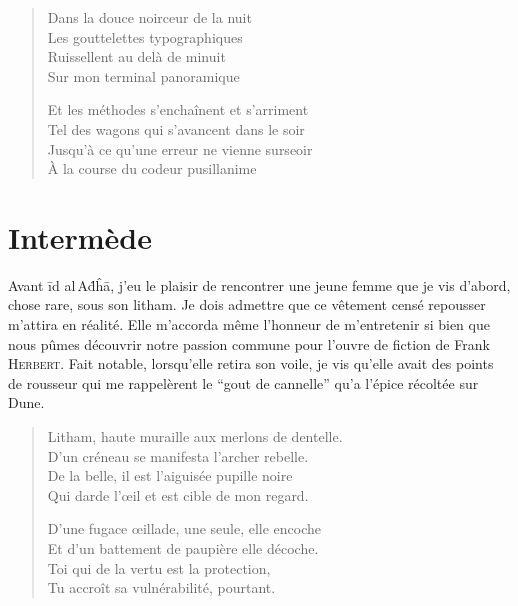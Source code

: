 \begin{verse}
Dans la douce noirceur de la nuit\\
Les gouttelettes typographiques\\
Ruissellent au delà de minuit\\
Sur mon terminal panoramique

Et les méthodes s’enchaînent et s’arriment\\
Tel des wagons qui s’avancent dans le soir\\
Jusqu’à ce qu’une erreur ne vienne surseoir\\
À la course du codeur pusillanime
\end{verse}

\section*{Intermède}
\begin{prose}
Avant īd al\,Aḋĥā, j’eu le plaisir de rencontrer une jeune femme que je vis d’abord, chose rare, sous son litham. Je dois admettre que ce vêtement censé repousser m’attira en réalité. Elle m’accorda même l’honneur de m’entretenir si bien que nous pûmes découvrir notre passion commune pour l’ouvre de fiction de Frank \textsc{Herbert}. Fait notable, lorsqu’elle retira son voile, je vis qu’elle avait des points de rousseur qui me rappelèrent le \enquote{gout de cannelle} qu’a l’épice récoltée sur Dune.
\end{prose}

\begin{verse}
Litham, haute muraille aux merlons de dentelle.\\
D’un créneau se manifesta l’archer rebelle.\\
De la belle, il est l’aiguisée pupille noire\\
Qui darde l’œil et est cible de mon regard.
 
D’une fugace œillade, une seule, elle encoche\\
Et d’un battement de paupière elle décoche.\\
Toi qui de la vertu est la protection,\\
Tu accroît sa vulnérabilité, pourtant.
\end{verse}



